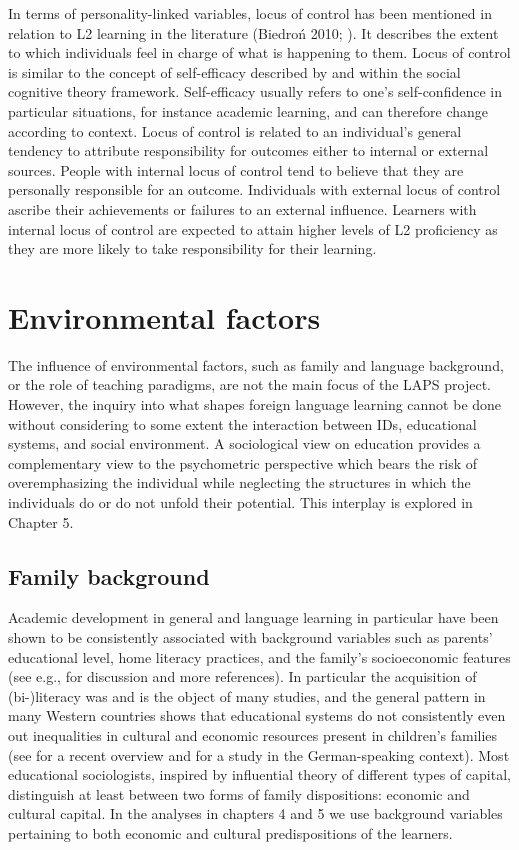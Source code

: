 \documentclass[output=paper]{langscibook}
\begin{document}
In terms of personality-linked variables, locus of control has been mentioned in relation to L2 learning in the literature (Biedroń 2010; \citealt{Peek2016}). It describes the extent to which individuals feel in charge of what is happening to them. Locus of control is similar to the concept of self-efficacy described by \citet{Bandura1986} and \citet{Rotter1990} within the social cognitive theory framework. Self-efficacy usually refers to one’s self-confidence in particular situations, for instance academic learning, and can therefore change according to context. Locus of control is related to an individual’s general tendency to attribute responsibility for outcomes either to internal or external sources. People with internal locus of control tend to believe that they are personally responsible for an outcome. Individuals with external locus of control ascribe their achievements or failures to an external influence. Learners with internal locus of control are expected to attain higher levels of L2 proficiency as they are more likely to take responsibility for their learning. 

\section{Environmental factors}

The influence of environmental factors, such as family and language background, or the role of teaching paradigms, are not the main focus of the LAPS project. However, the inquiry into what shapes foreign language learning cannot be done without considering to some extent the interaction between IDs, educational systems, and social environment. A sociological view on education provides a complementary view to the psychometric perspective which bears the risk of overemphasizing the individual while neglecting the structures in which the individuals do or do not unfold their potential. This interplay is explored in Chapter 5. 

\subsection{Family background} %

Academic development in general and language learning in particular have been shown to be consistently associated with background variables such as parents’ educational level, home literacy practices, and the family’s socioeconomic features (see e.g., \citealt{AvineriEtAl2015} for discussion and more references). In particular the acquisition of (bi-)literacy was and is the object of many studies, and the general pattern in many Western countries shows that educational systems do not consistently even out inequalities in cultural and economic resources present in children’s families (see \citealt{Farkas2018} for a recent overview and \citealt{KigelEtAl2015} for a study in the German-speaking context). Most educational sociologists, inspired by  influential theory of different types of capital, distinguish at least between two forms of family dispositions: economic and cultural capital. In the analyses in chapters 4 and 5 we use background variables pertaining to both economic and cultural predispositions of the learners.
\end{document}
